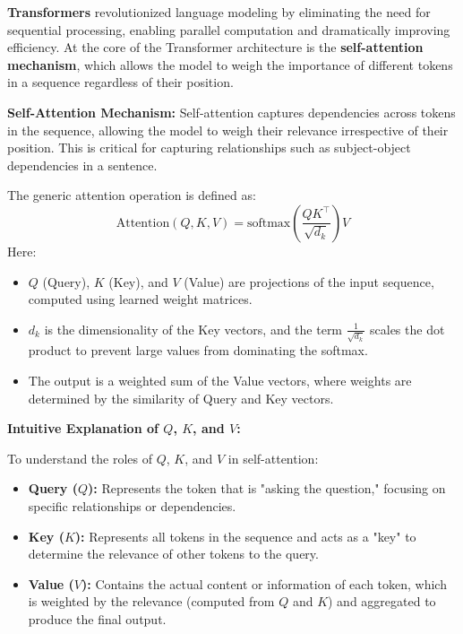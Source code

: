     \large \textbf{Transformers} revolutionized language modeling by eliminating the need for sequential processing, enabling parallel computation and dramatically improving efficiency. At the core of the Transformer architecture is the \textbf{self-attention mechanism}, which allows the model to weigh the importance of different tokens in a sequence regardless of their position. 

    \textbf{Self-Attention Mechanism:}
    Self-attention captures dependencies across tokens in the sequence, allowing the model to weigh their relevance irrespective of their position. This is critical for capturing relationships such as subject-object dependencies in a sentence.

    The generic attention operation is defined as:
    \[
    \text{Attention}(Q, K, V) = \text{softmax}\left(\frac{QK^\top}{\sqrt{d_k}}\right)V
    \]
    Here:
    \begin{itemize}
        \item \(Q\) (Query), \(K\) (Key), and \(V\) (Value) are projections of the input sequence, computed using learned weight matrices.
        \item \(d_k\) is the dimensionality of the Key vectors, and the term \(\frac{1}{\sqrt{d_k}}\) scales the dot product to prevent large values from dominating the softmax.
        \item The output is a weighted sum of the Value vectors, where weights are determined by the similarity of Query and Key vectors.
    \end{itemize}

    \textbf{Intuitive Explanation of \(Q\), \(K\), and \(V\):}

    To understand the roles of \(Q\), \(K\), and \(V\) in self-attention:
    \begin{itemize}
        \item \textbf{Query (\(Q\)):} Represents the token that is "asking the question," focusing on specific relationships or dependencies.
        \item \textbf{Key (\(K\)):} Represents all tokens in the sequence and acts as a "key" to determine the relevance of other tokens to the query.
        \item \textbf{Value (\(V\)):} Contains the actual content or information of each token, which is weighted by the relevance (computed from \(Q\) and \(K\)) and aggregated to produce the final output.
    \end{itemize}

